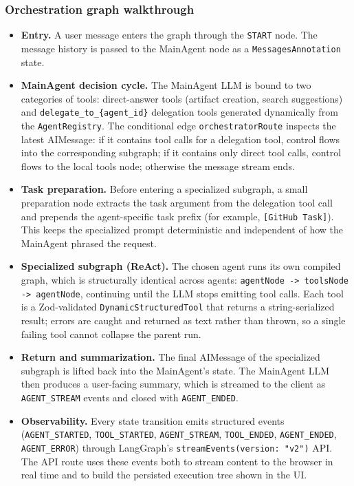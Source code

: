 \documentclass[11pt,a4paper]{report}
\newcommand{\code}[1]{\texttt{\small #1}}
\begin{document}
\subsubsection*{Orchestration graph walkthrough}

\begin{itemize}
  \item \textbf{Entry.} A user message enters the graph through the
    \code{START} node. The message history is passed to the MainAgent node as
    a \code{MessagesAnnotation} state.

  \item \textbf{MainAgent decision cycle.} The MainAgent LLM is bound to two
    categories of tools: direct-answer tools (artifact creation, search
    suggestions) and \code{delegate\_to\_\{agent\_id\}} delegation tools
    generated dynamically from the \code{AgentRegistry}. The conditional
    edge \code{orchestratorRoute} inspects the latest AIMessage: if it
    contains tool calls for a delegation tool, control flows into the
    corresponding subgraph; if it contains only direct tool calls, control
    flows to the local tools node; otherwise the message stream ends.

  \item \textbf{Task preparation.} Before entering a specialized subgraph,
    a small preparation node extracts the task argument from the delegation
    tool call and prepends the agent-specific task prefix (for example,
    \code{[GitHub Task]}). This keeps the specialized prompt deterministic
    and independent of how the MainAgent phrased the request.

  \item \textbf{Specialized subgraph (ReAct).} The chosen agent runs its own
    compiled graph, which is structurally identical across agents:
    \code{agentNode -> toolsNode -> agentNode}, continuing until the LLM
    stops emitting tool calls. Each tool is a Zod-validated
    \code{DynamicStructuredTool} that returns a string-serialized result;
    errors are caught and returned as text rather than thrown, so a single
    failing tool cannot collapse the parent run.

  \item \textbf{Return and summarization.} The final AIMessage of the
    specialized subgraph is lifted back into the MainAgent's state. The
    MainAgent LLM then produces a user-facing summary, which is streamed to
    the client as \code{AGENT\_STREAM} events and closed with
    \code{AGENT\_ENDED}.

  \item \textbf{Observability.} Every state transition emits structured
    events (\code{AGENT\_STARTED}, \code{TOOL\_STARTED}, \code{AGENT\_STREAM},
    \code{TOOL\_ENDED}, \code{AGENT\_ENDED}, \code{AGENT\_ERROR}) through
    LangGraph's \code{streamEvents(version: "v2")} API. The API route uses
    these events both to stream content to the browser in real time and to
    build the persisted execution tree shown in the UI.
\end{itemize}
\end{document}
